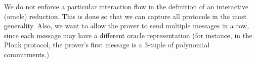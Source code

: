 
\begin{remark}
    We do not enforce a particular interaction flow in the definition of an interactive (oracle) reduction. This is done so that we can capture all protocols in the most generality. Also, we want to allow the prover to send multiple messages in a row, since each message may have a different oracle representation (for instance, in the Plonk protocol, the prover's first message is a 3-tuple of polynomial commitments.)
\end{remark}


